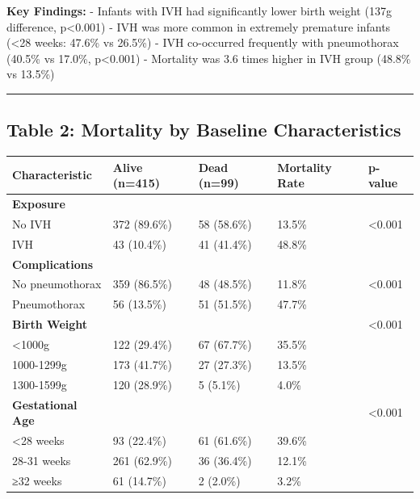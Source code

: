 \documentclass[
]{article}
\begin{document}
\textbf{Key Findings:} - Infants with IVH had significantly lower birth
weight (137g difference, p\textless0.001) - IVH was more common in
extremely premature infants (\textless28 weeks: 47.6\% vs 26.5\%) - IVH
co-occurred frequently with pneumothorax (40.5\% vs 17.0\%,
p\textless0.001) - Mortality was 3.6 times higher in IVH group (48.8\%
vs 13.5\%)

\begin{center}\rule{0.5\linewidth}{0.5pt}\end{center}

\hypertarget{table-2-mortality-by-baseline-characteristics}{%
\subsection{Table 2: Mortality by Baseline
Characteristics}\label{table-2-mortality-by-baseline-characteristics}}

\begin{longtable}[]{@{}lllll@{}}
\toprule
Characteristic & Alive (n=415) & Dead (n=99) & Mortality Rate &
p-value \\
\midrule
\endhead
\textbf{Exposure} & & & & \\
No IVH & 372 (89.6\%) & 58 (58.6\%) & 13.5\% & \textless0.001 \\
IVH & 43 (10.4\%) & 41 (41.4\%) & 48.8\% & \\
\textbf{Complications} & & & & \\
No pneumothorax & 359 (86.5\%) & 48 (48.5\%) & 11.8\% &
\textless0.001 \\
Pneumothorax & 56 (13.5\%) & 51 (51.5\%) & 47.7\% & \\
\textbf{Birth Weight} & & & & \textless0.001 \\
\textless1000g & 122 (29.4\%) & 67 (67.7\%) & 35.5\% & \\
1000-1299g & 173 (41.7\%) & 27 (27.3\%) & 13.5\% & \\
1300-1599g & 120 (28.9\%) & 5 (5.1\%) & 4.0\% & \\
\textbf{Gestational Age} & & & & \textless0.001 \\
\textless28 weeks & 93 (22.4\%) & 61 (61.6\%) & 39.6\% & \\
28-31 weeks & 261 (62.9\%) & 36 (36.4\%) & 12.1\% & \\
≥32 weeks & 61 (14.7\%) & 2 (2.0\%) & 3.2\% & \\
\bottomrule
\end{longtable}
\end{document}
